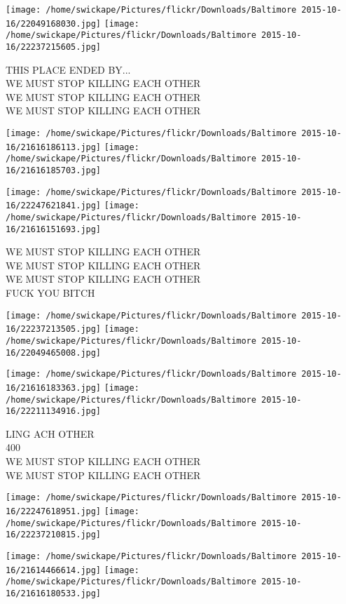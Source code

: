 \documentclass[10pt,letterpaper]{article}
\begin{document}
\texttt{[image: /home/swickape/Pictures/flickr/Downloads/Baltimore 2015-10-16/22049168030.jpg]}
\texttt{[image: /home/swickape/Pictures/flickr/Downloads/Baltimore 2015-10-16/22237215605.jpg]}

THIS PLACE ENDED BY...\\
WE MUST STOP KILLING EACH OTHER\\
WE MUST STOP KILLING EACH OTHER\\
WE MUST STOP KILLING EACH OTHER\\
\pagebreak

\texttt{[image: /home/swickape/Pictures/flickr/Downloads/Baltimore 2015-10-16/21616186113.jpg]}
\texttt{[image: /home/swickape/Pictures/flickr/Downloads/Baltimore 2015-10-16/21616185703.jpg]}

\texttt{[image: /home/swickape/Pictures/flickr/Downloads/Baltimore 2015-10-16/22247621841.jpg]}
\texttt{[image: /home/swickape/Pictures/flickr/Downloads/Baltimore 2015-10-16/21616151693.jpg]}

WE MUST STOP KILLING EACH OTHER\\
WE MUST STOP KILLING EACH OTHER\\
WE MUST STOP KILLING EACH OTHER\\
FUCK YOU BITCH\\
\pagebreak

\texttt{[image: /home/swickape/Pictures/flickr/Downloads/Baltimore 2015-10-16/22237213505.jpg]}
\texttt{[image: /home/swickape/Pictures/flickr/Downloads/Baltimore 2015-10-16/22049465008.jpg]}

\texttt{[image: /home/swickape/Pictures/flickr/Downloads/Baltimore 2015-10-16/21616183363.jpg]}
\texttt{[image: /home/swickape/Pictures/flickr/Downloads/Baltimore 2015-10-16/22211134916.jpg]}

LING ACH OTHER\\
400\\
WE MUST STOP KILLING EACH OTHER\\
WE MUST STOP KILLING EACH OTHER\\
\pagebreak

\texttt{[image: /home/swickape/Pictures/flickr/Downloads/Baltimore 2015-10-16/22247618951.jpg]}
\texttt{[image: /home/swickape/Pictures/flickr/Downloads/Baltimore 2015-10-16/22237210815.jpg]}

\texttt{[image: /home/swickape/Pictures/flickr/Downloads/Baltimore 2015-10-16/21614466614.jpg]}
\texttt{[image: /home/swickape/Pictures/flickr/Downloads/Baltimore 2015-10-16/21616180533.jpg]}
\end{document}
